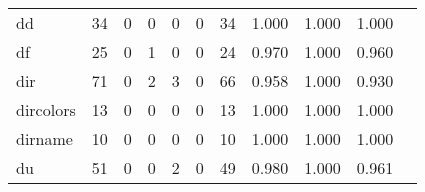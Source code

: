 \begin{longtable}{lp{1.2cm}p{1.2cm}p{1.2cm}p{1.2cm}p{1.2cm}p{1.2cm}p{1.2cm}p{1.2cm}p{1.2cm}p{1.2cm}}
dd        &                                    34 &                                                  0 &                                                  0 &                                                  0 &                                                  0 &                                                 34 &                                         1.000 &                                              1.000 &                                              1.000 \\
df        &                                    25 &                                                  0 &                                                  1 &                                                  0 &                                                  0 &                                                 24 &                                         0.970 &                                              1.000 &                                              0.960 \\
dir       &                                    71 &                                                  0 &                                                  2 &                                                  3 &                                                  0 &                                                 66 &                                         0.958 &                                              1.000 &                                              0.930 \\
dircolors &                                    13 &                                                  0 &                                                  0 &                                                  0 &                                                  0 &                                                 13 &                                         1.000 &                                              1.000 &                                              1.000 \\
dirname   &                                    10 &                                                  0 &                                                  0 &                                                  0 &                                                  0 &                                                 10 &                                         1.000 &                                              1.000 &                                              1.000 \\
du        &                                    51 &                                                  0 &                                                  0 &                                                  2 &                                                  0 &                                                 49 &                                         0.980 &                                              1.000 &                                              0.961 \\

\end{longtable}
